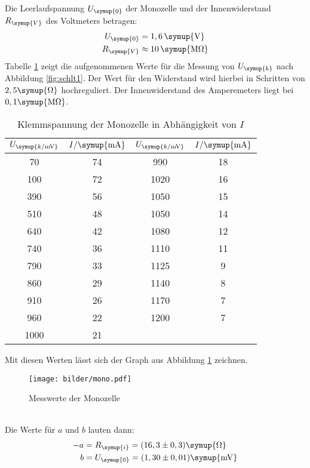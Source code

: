 Die Leerlaufspannung $U_\symup{0}$ der Monozelle und der Innenwiderstand
$R_\symup{V}$ des Voltmeters betragen:
\begin{align*}
  U_\symup{0} &= 1,6 \,\symup{\si{\volt}} \\
  R_\symup{V} &\approx 10\,\symup{\si{\mega\ohm}}
\end{align*}
Tabelle \ref{tab:U_k} zeigt die aufgenommenen Werte für die Messung von
$U_\symup{k}$ nach Abbildung \ref{fig:schlt1}. Der Wert für den Widerstand wird
hierbei in Schritten von $2,5\symup{\si\ohm}$ hochreguliert. Der Innenwiderstand
des Amperemeters liegt bei $0,1 \symup{\si{\mega\ohm}}$.
\begin{table}[H]
  \centering
  \begin{tabular}{c c c c}
    \toprule
    $U_\symup{k/\si{\milli\volt}}$ & $I/\symup{\si{\milli\ampere}}$  &
    $U_\symup{k/\si{\milli\volt}}$ & $I/\symup{\si{\milli\ampere}}$  \\
    \midrule
      70  &  74  &   990  &  18  \\
     100  &  72  &  1020  &  16  \\
     390  &  56  &  1050  &  15  \\
     510  &  48  &  1050  &  14  \\
     640  &  42  &  1080  &  12  \\
     740  &  36  &  1110  &  11  \\
     790  &  33  &  1125  &   9  \\
     860  &  29  &  1140  &   8  \\
     910  &  26  &  1170  &   7  \\
     960  &  22  &  1200  &   7  \\
    1000  &  21  &  \hrulefill  & \hrulefill  \\
    \bottomrule
  \end{tabular}
  \caption{Klemmspannung der Monozelle in Abhängigkeit von $I$}
  \label{tab:U_k}
\end{table}
Mit diesen Werten lässt sich der Graph aus Abbildung \ref{fig:mono} zeichnen.
\begin{figure}[h]
  \centering
  \texttt{[image: bilder/mono.pdf]}
  \caption{Messwerte der Monozelle}
  \label{fig:mono}
\end{figure}
\\
Die Werte für $a$ und $b$ lauten dann:
\begin{align*}
  -a &= R_\symup{i} = (16,3 \pm 0,3) \symup{\si{\ohm}} \\ %
   b &= U_\symup{0} = (1,30 \pm 0,01) \symup{\si{\milli\volt}}
\end{align*}
